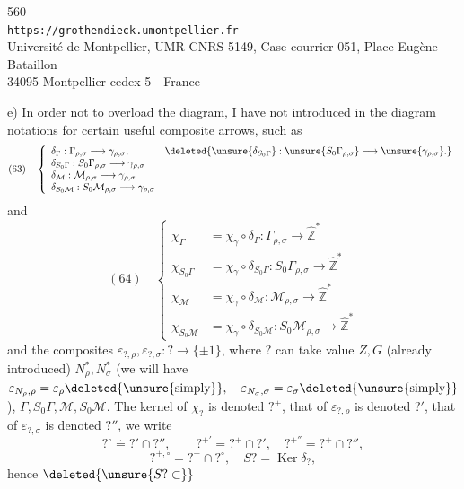 
{\small
\begin{center}
560\\
\texttt{https://grothendieck.umontpellier.fr}\\
Université de Montpellier, UMR CNRS 5149, Case courrier 051, Place Eugène Bataillon\\
34095 Montpellier cedex 5 - France
\end{center}
}


e) In order not to overload the diagram, I have not introduced in
the diagram notations for certain useful composite arrows,
such as
\[
(63)\quad
\left\{
\begin{array}{ll}
\delta_\Gamma:\Gamma_{\rho,\sigma}\longrightarrow\gamma_{\rho,\sigma},
&
\deleted{\unsure{\delta_{S_0\Gamma}}:
\unsure{S_0\Gamma_{\rho,\sigma}}\longrightarrow
\unsure{\gamma_{\rho,\sigma}}.}\\
\delta_{S_0\Gamma}:S_0\Gamma_{\rho,\sigma}
\longrightarrow\gamma_{\rho,\sigma}&\\
\delta_{\mathcal M}:\mathcal M_{\rho,\sigma}
\longrightarrow\gamma_{\rho,\sigma}&\\
\delta_{S_0\mathcal M}:S_0\mathcal M_{\rho,\sigma}
\longrightarrow\gamma_{\rho,\sigma}&
\end{array}
\right.
\]
and
\[
(64)\quad
\left\{
\begin{aligned}
\chi_\Gamma&=\chi_\gamma\circ\delta_\Gamma:
\Gamma_{\rho,\sigma}\longrightarrow\widehat{\mathbb Z}^{*}\\
\chi_{S_0\Gamma}&=\chi_\gamma\circ\delta_{S_0\Gamma}:
S_0\Gamma_{\rho,\sigma}\longrightarrow\widehat{\mathbb Z}^{*}\\
\chi_{\mathcal M}&=\chi_\gamma\circ\delta_{\mathcal M}:
\mathcal M_{\rho,\sigma}\longrightarrow\widehat{\mathbb Z}^{*}\\
\chi_{S_0\mathcal M}&=\chi_\gamma\circ\delta_{S_0\mathcal M}:
S_0\mathcal M_{\rho,\sigma}\longrightarrow\widehat{\mathbb Z}^{*}
\end{aligned}
\right.
\]
and the composites
\(\varepsilon_{?,\rho},\varepsilon_{?,\sigma}:?\longrightarrow\{\pm1\}\),
where \(?\) can take  value
\(Z,G\) (already introduced) \(N_\rho^*,N_\sigma^*\)
(we will have
\(\varepsilon_{N_\rho,\rho}=\varepsilon_\rho
\deleted{\text{\unsure{simply}}},\quad
\varepsilon_{N_\sigma,\sigma}=\varepsilon_\sigma
\deleted{\text{\unsure{simply}}}\)),
\(\Gamma,S_0\Gamma,\mathcal M,S_0\mathcal M\).
The kernel of \(\chi_?\) is denoted \(?^+\), that of
\(\varepsilon_{?,\rho}\) is denoted \(?'\), that of
\(\varepsilon_{?,\sigma}\) is denoted \(?''\),
we write
\[
?^\circ\doteq?'\cap?'',\qquad
?^{+'}=?^+\cap?',\quad
?^{+''}=?^+\cap?'',
\]
\[
?^{+,\circ}=?^+\cap?^\circ,\quad
S?=\operatorname{Ker}\delta_?,
\]
 hence \(\deleted{\unsure{S?\subset}}\)

